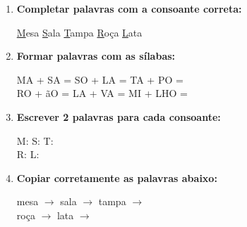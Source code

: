 \begin{exercicio}
\begin{enumerate}[resume]
  \item \textbf{Completar palavras com a consoante correta:}
  \begin{center}
  \underline{M}esa \quad \underline{S}ala \quad \underline{T}ampa \quad \underline{R}oça \quad \underline{L}ata
  \end{center}

  \item \textbf{Formar palavras com as sílabas:}
  \begin{center}
  MA + SA = \underline{\hspace{2cm}} \quad SO + LA = \underline{\hspace{2cm}} \quad TA + PO = \underline{\hspace{2cm}} \\
  RO + ãO = \underline{\hspace{2cm}} \quad LA + VA = \underline{\hspace{2cm}} \quad MI + LHO = \underline{\hspace{2cm}}
  \end{center}

  \item \textbf{Escrever 2 palavras para cada consoante:}
  \begin{center}
  M: \underline{\hspace{3cm}} \underline{\hspace{3cm}} \quad S: \underline{\hspace{3cm}} \underline{\hspace{3cm}} \quad T: \underline{\hspace{3cm}} \underline{\hspace{3cm}} \\
  R: \underline{\hspace{3cm}} \underline{\hspace{3cm}} \quad L: \underline{\hspace{3cm}} \underline{\hspace{3cm}}
  \end{center}

  \item \textbf{Copiar corretamente as palavras abaixo:}
  \begin{center}
  mesa $\rightarrow$ \underline{\hspace{3cm}} \quad sala $\rightarrow$ \underline{\hspace{3cm}} \quad tampa $\rightarrow$ \underline{\hspace{3cm}} \\
  roça $\rightarrow$ \underline{\hspace{3cm}} \quad lata $\rightarrow$ \underline{\hspace{3cm}}
  \end{center}
\end{enumerate}


\end{exercicio}
